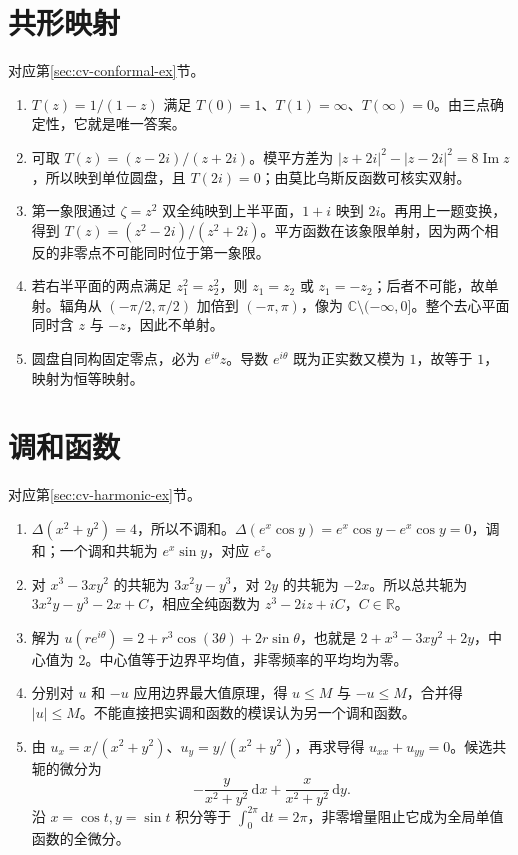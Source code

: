 \documentclass[UTF8,12pt,a4paper,fontset=fandol]{ctexbook}
\begin{document}
\section{共形映射}
对应第\ref{sec:cv-conformal-ex}节。
\begin{enumerate}
 \item $T(z)=1/(1-z)$ 满足 $T(0)=1$、$T(1)=\infty$、$T(\infty)=0$。由三点确定性，它就是唯一答案。
 \item 可取 $T(z)=(z-2i)/(z+2i)$。模平方差为 $|z+2i|^2-|z-2i|^2=8\operatorname{Im}z$，所以映到单位圆盘，且 $T(2i)=0$；由莫比乌斯反函数可核实双射。
 \item 第一象限通过 $\zeta=z^2$ 双全纯映到上半平面，$1+i$ 映到 $2i$。再用上一题变换，得到 $T(z)=(z^2-2i)/(z^2+2i)$。平方函数在该象限单射，因为两个相反的非零点不可能同时位于第一象限。
 \item 若右半平面的两点满足 $z_1^2=z_2^2$，则 $z_1=z_2$ 或 $z_1=-z_2$；后者不可能，故单射。辐角从 $(-\pi/2,\pi/2)$ 加倍到 $(-\pi,\pi)$，像为 $\mathbb C\setminus(-\infty,0]$。整个去心平面同时含 $z$ 与 $-z$，因此不单射。
 \item 圆盘自同构固定零点，必为 $e^{i\theta}z$。导数 $e^{i\theta}$ 既为正实数又模为 $1$，故等于 $1$，映射为恒等映射。
\end{enumerate}

\section{调和函数}
对应第\ref{sec:cv-harmonic-ex}节。
\begin{enumerate}
 \item $\Delta(x^2+y^2)=4$，所以不调和。$\Delta(e^x\cos y)=e^x\cos y-e^x\cos y=0$，调和；一个调和共轭为 $e^x\sin y$，对应 $e^z$。
 \item 对 $x^3-3xy^2$ 的共轭为 $3x^2y-y^3$，对 $2y$ 的共轭为 $-2x$。所以总共轭为 $3x^2y-y^3-2x+C$，相应全纯函数为 $z^3-2iz+iC$，$C\in\mathbb R$。
 \item 解为 $u(re^{i\theta})=2+r^3\cos(3\theta)+2r\sin\theta$，也就是 $2+x^3-3xy^2+2y$，中心值为 $2$。中心值等于边界平均值，非零频率的平均均为零。
 \item 分别对 $u$ 和 $-u$ 应用边界最大值原理，得 $u\le M$ 与 $-u\le M$，合并得 $|u|\le M$。不能直接把实调和函数的模误认为另一个调和函数。
 \item 由 $u_x=x/(x^2+y^2)$、$u_y=y/(x^2+y^2)$，再求导得 $u_{xx}+u_{yy}=0$。候选共轭的微分为
 \[
 -\frac y{x^2+y^2}\,\mathrm dx+\frac x{x^2+y^2}\,\mathrm dy.
 \]
 沿 $x=\cos t,y=\sin t$ 积分等于 $\int_0^{2\pi}\mathrm dt=2\pi$，非零增量阻止它成为全局单值函数的全微分。
\end{enumerate}
\end{document}
